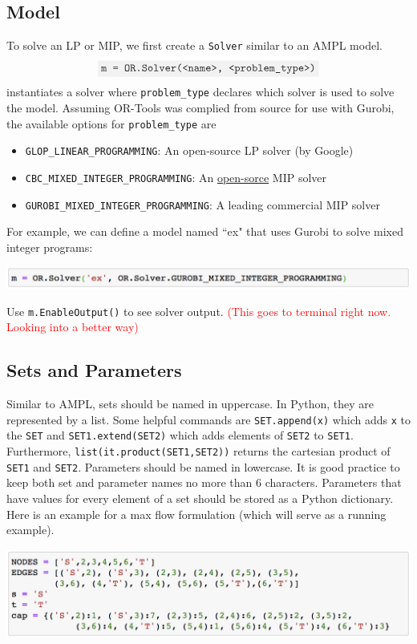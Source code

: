 \documentclass[11 pt]{article}
\newcommand{\code}[1]{\colorbox{gray!10}{\textcolor{black!85}{\texttt{#1}}}}
\begin{document}
\subsection{Model}

To solve an LP or MIP, we first create a \texttt{Solver} similar to an AMPL model. $$\code{m = OR.Solver(<name>, <problem\_type>)}$$ instantiates a solver where \texttt{problem\_type} declares which solver is used to solve the model. Assuming OR-Tools was complied from source for use with Gurobi, the available options for \texttt{problem\_type} are
\begin{itemize}
\item \texttt{GLOP\_LINEAR\_PROGRAMMING}: An open-source LP solver (by Google)
\item \texttt{CBC\_MIXED\_INTEGER\_PROGRAMMING}: An \href{https://github.com/coin-or/Cbc}{open-sorce} MIP solver
\item \texttt{GUROBI\_MIXED\_INTEGER\_PROGRAMMING}: A leading commercial MIP solver
\end{itemize}
For example, we can define a model named ``ex" that uses Gurobi to solve mixed integer programs:
\begin{center}
\includegraphics[scale=0.7]{model.png}
\end{center}
Use \code{m.EnableOutput()} to see solver output. \textcolor{red}{(This goes to terminal right now. Looking into a better way)}

\subsection{Sets and Parameters}

Similar to AMPL, sets should be named in uppercase. In Python, they are represented by a list. Some helpful commands are \code{SET.append(x)} which adds \texttt{x} to the \texttt{SET} and \code{SET1.extend(SET2)} which adds elements of \texttt{SET2} to \texttt{SET1}. Furthermore, \code{list(it.product(SET1,SET2))} returns the cartesian product of \texttt{SET1} and \texttt{SET2}. Parameters should be named in lowercase. It is good practice to keep both set and parameter names no more than 6 characters. Parameters that have values for every element of a set should be stored as a Python dictionary. Here is an example for a max flow formulation (which will serve as a running example).
\begin{center}
\includegraphics[scale=0.7]{setAndParam.png}
\end{center}
\end{document}
